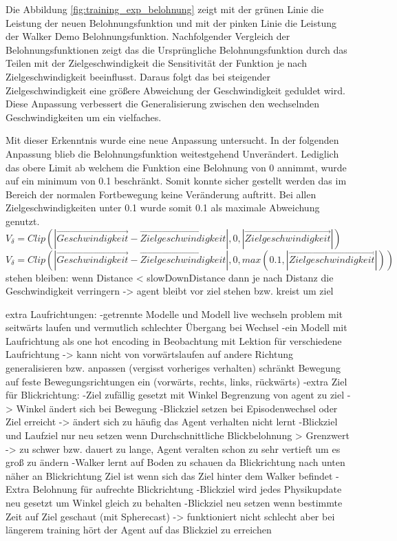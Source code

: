 Die Abbildung \ref{fig:training_exp_belohnung} zeigt mit der grünen Linie die Leistung der neuen Belohnungsfunktion und mit der pinken Linie die Leistung der Walker Demo Belohnungsfunktion. Nachfolgender Vergleich der Belohnungsfunktionen zeigt das die Ursprüngliche Belohnungsfunktion durch das Teilen mit der Zielgeschwindigkeit die Sensitivität der Funktion je nach Zielgeschwindigkeit beeinflusst. Daraus folgt das bei steigender Zielgeschwindigkeit eine größere Abweichung der Geschwindigkeit geduldet wird. Diese Anpassung verbessert die Generalisierung zwischen den wechselnden Geschwindigkeiten um ein vielfaches.

Mit dieser Erkenntnis wurde eine neue Anpassung untersucht. In der folgenden Anpassung blieb die Belohnungsfunktion weitestgehend Unverändert. Lediglich das obere Limit ab welchem die Funktion eine Belohnung von 0 annimmt, wurde auf ein minimum von 0.1 beschränkt. Somit konnte sicher gestellt werden das im Bereich der normalen Fortbewegung keine Veränderung auftritt. Bei allen Zielgeschwindigkeiten unter 0.1 wurde somit 0.1 als maximale Abweichung genutzt.\\
$V_\delta=Clip(|\vec{Geschwindigkeit} - \vec{Zielgeschwindigkeit}|, 0, |\vec{Zielgeschwindigkeit}|)$ \\
$V_\delta=Clip(|\vec{Geschwindigkeit} - \vec{Zielgeschwindigkeit}|, 0, max(0.1, |\vec{Zielgeschwindigkeit}|))$ \\



stehen bleiben:
wenn Distance < slowDownDistance dann je nach Distanz die Geschwindigkeit verringern -> agent bleibt vor ziel stehen bzw. kreist um ziel

extra Laufrichtungen:
-getrennte Modelle und Modell live wechseln problem mit seitwärts laufen und vermutlich schlechter Übergang bei Wechsel
-ein Modell mit Laufrichtung als one hot encoding in Beobachtung mit Lektion für verschiedene Laufrichtung -> kann nicht von vorwärtslaufen auf andere Richtung generalisieren bzw. anpassen (vergisst vorheriges verhalten) schränkt Bewegung auf feste Bewegungsrichtungen ein (vorwärts, rechts, links, rückwärts)
-extra Ziel für Blickrichtung:
  -Ziel zufällig gesetzt mit Winkel Begrenzung von agent zu ziel -> Winkel ändert sich bei Bewegung
  -Blickziel setzen bei Episodenwechsel oder Ziel erreicht -> ändert sich zu häufig das Agent verhalten nicht lernt
  -Blickziel und Laufziel nur neu setzen wenn Durchschnittliche Blickbelohnung > Grenzwert -> zu schwer bzw. dauert zu lange, Agent veralten schon zu sehr vertieft um es groß zu ändern
  -Walker lernt auf Boden zu schauen da Blickrichtung nach unten näher an Blickrichtung Ziel ist wenn sich das Ziel hinter dem Walker befindet
  -Extra Belohnung für aufrechte Blickrichtung
  -Blickziel wird jedes Physikupdate neu gesetzt um Winkel gleich zu behalten
  -Blickziel neu setzen wenn bestimmte Zeit auf Ziel geschaut (mit Spherecast) -> funktioniert nicht schlecht aber bei längerem training hört der Agent auf das Blickziel zu erreichen